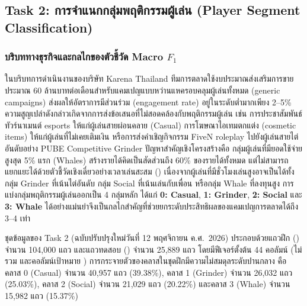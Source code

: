\clearpage
\subsection{Task 2: การจำแนกกลุ่มพฤติกรรมผู้เล่น (Player Segment Classification)}
\label{subsec:task2}

\subsubsection{บริบททางธุรกิจและกลไกของตัวชี้วัด Macro $F_1$}
\label{subsubsec:t2_business_metric}

ในบริบทการดำเนินงานของบริษัท Karena Thailand ทีมการตลาดใช้งบประมาณส่งเสริมการขายประมาณ 60 ล้านบาทต่อเดือนสำหรับแคมเปญแบบหว่านแหครอบคลุมผู้เล่นทั้งหมด (generic campaigns) ส่งผลให้อัตราการมีส่วนร่วม (engagement rate) อยู่ในระดับต่ำมากเพียง 2--5\% ความสูญเปล่าดังกล่าวเกิดจากการส่งข้อเสนอที่ไม่สอดคล้องกับพฤติกรรมผู้เล่น เช่น การประชาสัมพันธ์ทัวร์นาเมนต์ esports ให้แก่ผู้เล่นสายผ่อนคลาย (Casual) การโฆษณาไอเทมตกแต่ง (cosmetic items) ให้แก่ผู้เล่นที่ไม่เคยเติมเงิน หรือการส่งคำเชิญกิจกรรม FiveN roleplay ไปยังผู้เล่นสายไต่อันดับอย่าง PUBE Competitive Grinder ปัญหาสำคัญเชิงโครงสร้างคือ กลุ่มผู้เล่นที่มียอดใช้จ่ายสูงสุด 5\% แรก (Whales) สร้างรายได้คิดเป็นสัดส่วนถึง 60\% ของรายได้ทั้งหมด แต่ไม่สามารถแยกแยะได้ด้วยตัวชี้วัดเชิงเดี่ยวอย่างเวลาเล่นสะสม () เนื่องจากผู้เล่นที่มีชั่วโมงเล่นสูงอาจเป็นได้ทั้งกลุ่ม Grinder ที่เน้นไต่อันดับ กลุ่ม Social ที่เน้นเล่นกับเพื่อน หรือกลุ่ม Whale ที่ลงทุนสูง การแบ่งกลุ่มพฤติกรรมผู้เล่นออกเป็น 4 กลุ่มหลัก ได้แก่ \textbf{0: Casual}, \textbf{1: Grinder}, \textbf{2: Social} และ \textbf{3: Whale} ได้อย่างแม่นยำจึงเป็นกลไกสำคัญที่ช่วยยกระดับประสิทธิผลของแคมเปญการตลาดได้ถึง 3--4 เท่า

ชุดข้อมูลของ Task 2 (ฉบับปรับปรุงใหม่วันที่ 12 พฤศจิกายน ค.ศ.~2026) ประกอบด้วยแถวฝึก () จำนวน 104,000 แถว และแถวทดสอบ () จำนวน 25,889 แถว โดยมีฟีเจอร์ตั้งต้น 44 คอลัมน์ (ไม่รวม  และคอลัมน์เป้าหมาย ) การกระจายตัวของคลาสในชุดฝึกมีความไม่สมดุลระดับปานกลาง คือ คลาส 0 (Casual) จำนวน 40,957 แถว (39.38\%), คลาส 1 (Grinder) จำนวน 26,032 แถว (25.03\%), คลาส 2 (Social) จำนวน 21,029 แถว (20.22\%) และคลาส 3 (Whale) จำนวน 15,982 แถว (15.37\%)

